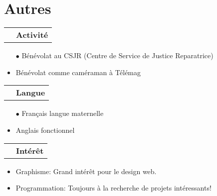 \documentclass[a4paper,9pt]{extarticle}
\makeatletter
\newlength{\indicewidth}%
\newlength{\separatorcolumnwidth}%
\newlength{\maincolumnwidth}%
\newcommand{\indicestyle}[1]{\slshape\textcolor{color0}{#1}}
\def\middleline{
\raisebox{0.35em}{\line(1,0){50}}
}
\renewcommand{\subsection}[1]{
\par\addvspace{3ex}
\begin{tabular}{@{}p{\indicewidth}@{\hspace{\separatorcolumnwidth}}p{\maincolumnwidth}@{}}%
    \raggedleft\indicestyle{}\middleline & { \strut\bfseries {#1} }%
    \par
\end{tabular}%
\vspace{-0.5em}
}
\makeatother
\begin{document}
\section{Autres}
\subsection{Activité}
\begin{itemize}

\item[$\bullet$]Bénévolat au CSJR (Centre de Service de Justice Reparatrice)
\item Bénévolat comme caméraman à Télémag
\end{itemize}
\subsection{Langue}
\begin{itemize}
\item[$\bullet$] Français langue maternelle 
\item Anglais fonctionnel
\end{itemize}

\subsection{Intérêt}
\begin{itemize}
\item Graphisme: Grand intérêt pour le design web.
\item Programmation: Toujours à la recherche de projets intéressants!
\end{itemize}

\end{document}
